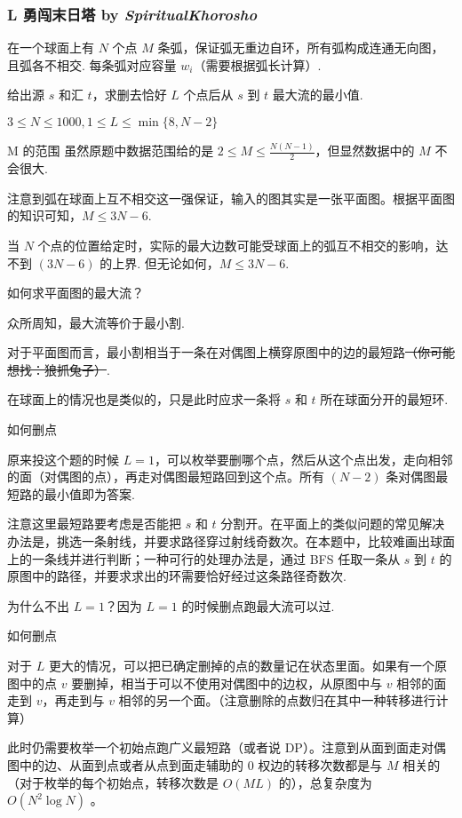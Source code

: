 \frame
{
  \frametitle{L 勇闯末日塔 {by \itshape SpiritualKhorosho}}
	在一个球面上有 $N$ 个点 $M$ 条弧，保证弧无重边自环，所有弧构成连通无向图，且弧各不相交. 每条弧对应容量 $w_i$（需要根据弧长计算）.

	给出源 $s$ 和汇 $t$，求删去恰好 $L$ 个点后从 $s$ 到 $t$ 最大流的最小值.

	$3\le N \le 1000, 1\le L \le \min\{8, N-2\}$

}

\begin{frame}{M 的范围}
	虽然原题中数据范围给的是 $2\le M\le \frac{N(N-1)}{2}$，但显然数据中的 $M$ 不会很大. \pause

	注意到弧在球面上互不相交这一强保证，输入的图其实是一张平面图。根据平面图的知识可知，$M\le 3N-6$. \pause

	当 $N$ 个点的位置给定时，实际的最大边数可能受球面上的弧互不相交的影响，达不到 $(3N-6)$ 的上界. 但无论如何，$M\le 3N-6$.
\end{frame}


\begin{frame}{如何求平面图的最大流？}

	众所周知，最大流等价于最小割.

	对于平面图而言，最小割相当于一条在对偶图上横穿原图中的边的最短路\sout{（你可能想找：狼抓兔子）}.

	在球面上的情况也是类似的，只是此时应求一条将 $s$ 和 $t$ 所在球面分开的最短环.

\end{frame}

\begin{frame}{如何删点}

	原来投这个题的时候 $L=1$，可以枚举要删哪个点，然后从这个点出发，走向相邻的面（对偶图的点），再走对偶图最短路回到这个点。所有 $(N-2)$ 条对偶图最短路的最小值即为答案.

	注意这里最短路要考虑是否能把 $s$ 和 $t$ 分割开。在平面上的类似问题的常见解决办法是，挑选一条射线，并要求路径穿过射线奇数次。在本题中，比较难画出球面上的一条线并进行判断；一种可行的处理办法是，通过 BFS 任取一条从 $s$ 到 $t$ 的原图中的路径，并要求求出的环需要恰好经过这条路径奇数次.

	为什么不出 $L=1$？因为 $L=1$ 的时候删点跑最大流可以过.

\end{frame}


\begin{frame}{如何删点}

	对于 $L$ 更大的情况，可以把已确定删掉的点的数量记在状态里面。如果有一个原图中的点 $v$ 要删掉，相当于可以不使用对偶图中的边权，从原图中与 $v$ 相邻的面走到 $v$，再走到与 $v$ 相邻的另一个面。（注意删除的点数归在其中一种转移进行计算）

	此时仍需要枚举一个初始点跑广义最短路（或者说 DP）。注意到从面到面走对偶图中的边、从面到点或者从点到面走辅助的 $0$ 权边的转移次数都是与 $M$ 相关的（对于枚举的每个初始点，转移次数是 $O(ML)$ 的），总复杂度为 $O\left(N^2 \log N\right)$ 。

\end{frame}

